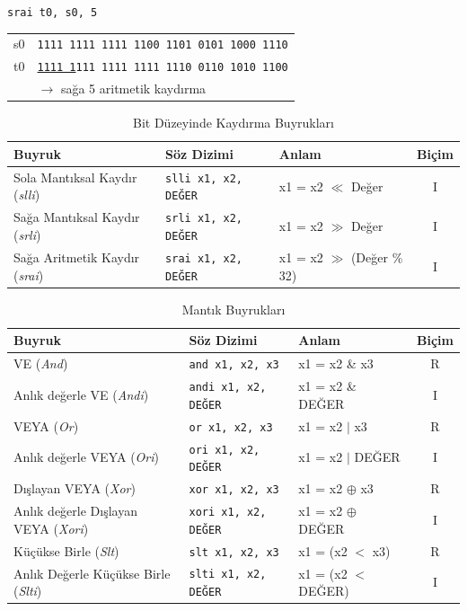 \begin{center}\texttt{srai t0, s0, 5} \end{center}\vspace{-6pt}
\begin{center}
\small
\begin{tabular}{r@{\;\;}l}
  s0 & \texttt{1111\,1111\,1111\,1100\,1101\,0101\,1000\,1110} \\
  t0 & \texttt{\underline{1111\,1}111\,1111\,1111\,1110\,0110\,1010\,1100} \\
  & \hfill$\longrightarrow$ \textnormal{sağa 5 aritmetik kaydırma} \\
\end{tabular}
\end{center}

\begin{table}[htbp]
\centering
\caption{Bit Düzeyinde Kaydırma Buyrukları}
\label{tab:ari-kaydirma-buyruklar}
\begin{tabularx}{\textwidth}{l l X c}
\toprule
\textbf{Buyruk} & \textbf{Söz Dizimi} & \textbf{Anlam} & \textbf{Biçim} \\
\midrule
Sola Mantıksal Kaydır (\emph{slli}) & \texttt{slli x1, x2, DEĞER} & x1 = x2 $\ll$ Değer & I \\
Sağa Mantıksal Kaydır (\emph{srli}) & \texttt{srli x1, x2, DEĞER} & x1 = x2 $\gg$ Değer & I \\
Sağa Aritmetik Kaydır (\emph{srai}) & \texttt{srai x1, x2, DEĞER} & x1 = x2 $\gg$ (Değer \% 32) & I \\
\bottomrule
\end{tabularx}
\end{table}

\begin{table}[htbp]
\centering
\caption{Mantık Buyrukları}
\label{tab:ari-mantik-buyruklar}
\begin{tabularx}{\textwidth}{l l X c}
\toprule
\textbf{Buyruk} & \textbf{Söz Dizimi} & \textbf{Anlam} & \textbf{Biçim} \\
\midrule
VE (\emph{And}) & \texttt{and x1, x2, x3} & x1 = x2 \& x3 & R \\
Anlık değerle VE (\emph{Andi}) & \texttt{andi x1, x2, DEĞER} & x1 = x2 \& DEĞER & I \\
VEYA (\emph{Or}) & \texttt{or x1, x2, x3} & x1 = x2 $|$ x3 & R \\
Anlık değerle VEYA (\emph{Ori}) & \texttt{ori x1, x2, DEĞER} & x1 = x2 $|$ DEĞER & I \\
Dışlayan VEYA (\emph{Xor}) & \texttt{xor x1, x2, x3} & x1 = x2 $\oplus$ x3 & R \\
Anlık değerle Dışlayan VEYA (\emph{Xori}) & \texttt{xori x1, x2, DEĞER} & x1 = x2 $\oplus$ DEĞER & I \\
Küçükse Birle (\emph{Slt}) & \texttt{slt x1, x2, x3} & x1 = (x2 $<$ x3) & R \\
Anlık Değerle Küçükse Birle (\emph{Slti}) & \texttt{slti x1, x2, DEĞER} & x1 = (x2 $<$ DEĞER) & I \\
\bottomrule
\end{tabularx}
\end{table}

